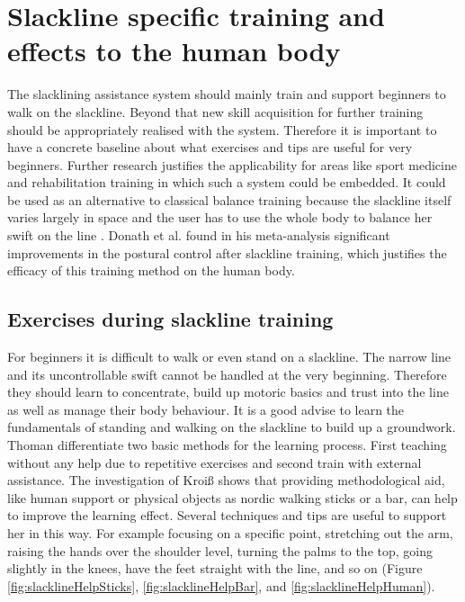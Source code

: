 \section{Slackline specific training and effects to the human body}

The slacklining assistance system should mainly train and support beginners to walk on the slackline. Beyond that new skill acquisition for further training should be appropriately realised with the system. Therefore it is important to have a concrete baseline about what exercises and tips are useful for very beginners.  Further research justifies the applicability for areas like sport medicine and rehabilitation training in which such a system could be embedded. It could be used as an alternative to classical balance training because the slackline itself varies largely in space and the user has to use the whole body to balance her swift on the line \cite{Pfusterschmied2013-yy}. Donath et al. \cite{Donath2016-rt} found in his meta-analysis significant improvements in the postural control after slackline training, which justifies the efficacy of this training method on the human body.

\subsection{Exercises during slackline training}

For beginners it is difficult to walk or even stand on a slackline. The narrow line and its uncontrollable swift cannot be handled at the very beginning. Therefore they should learn to concentrate, build up motoric basics and trust into the line as well as manage their body behaviour. It is a good advise to learn the fundamentals of standing and walking on the slackline to build up a groundwork.
Thoman \cite{Thomann2013-aa} differentiate two basic methods for the learning process. First teaching without any help due to repetitive exercises and second train with external assistance. The investigation of Kroiß \cite{Kroiss2007-ab} shows that providing methodological aid, like human support or physical objects as nordic walking sticks or a bar, can help to improve the learning effect. Several techniques and tips are useful to support her in this way. For example focusing on a specific point, stretching out the arm, raising the hands over the shoulder level, turning the palms to the top, going slightly in the knees, have the feet straight with the line, and so on \cite{Kroiss2007-ab} \cite{Kleindl2011-bl} (Figure \ref{fig:slacklineHelpSticks}, \ref{fig:slacklineHelpBar}, and \ref{fig:slacklineHelpHuman}).

